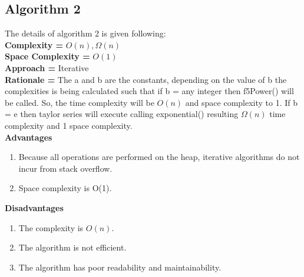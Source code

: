 \documentclass[10pt]{article}
\begin{document}
\subsection{Algorithm 2}
The details of algorithm 2 is given following:
\\\textbf{ Complexity = } $O(n), \Omega(n)$
\\\textbf{Space Complexity = } $O(1)$
\\\textbf{Approach = } Iterative
\\\textbf{Rationale = } The a and b are the constants, depending on the value of b the complexities is being calculated such that if b = any integer then f5Power() will be called. So, the time complexity will be $O(n)$ and space complexity to 1. If b = e then taylor series will execute calling exponential() resulting $\Omega(n)$ time complexity and 1 space complexity.
\\\textbf{Advantages}
\begin{enumerate}
    \item Because all operations are performed on the heap, iterative algorithms do not incur from stack overflow.
    \item Space complexity is O(1).
\end{enumerate}
\textbf{Disadvantages}
\begin{enumerate}
    \item The complexity is $O(n)$.
    \item The algorithm is not efficient.
    \item The algorithm has poor readability and maintainability.
\end{enumerate}
\end{document}
